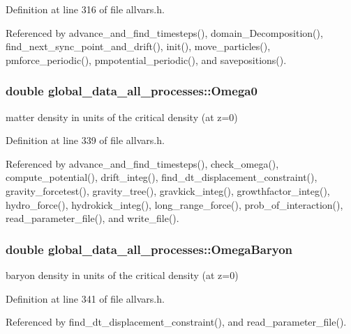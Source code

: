 Definition at line 316 of file allvars.h.



Referenced by advance\_\-and\_\-find\_\-timesteps(), domain\_\-Decomposition(), find\_\-next\_\-sync\_\-point\_\-and\_\-drift(), init(), move\_\-particles(), pmforce\_\-periodic(), pmpotential\_\-periodic(), and savepositions().

\hypertarget{structglobal__data__all__processes_abac5eca1b5851e670eec01d4dd47c417}{
\subsubsection[{Omega0}]{\setlength{\rightskip}{0pt plus 5cm}double {\bf global\_\-data\_\-all\_\-processes::Omega0}}}
\label{structglobal__data__all__processes_abac5eca1b5851e670eec01d4dd47c417}
matter density in units of the critical density (at z=0) 

Definition at line 339 of file allvars.h.



Referenced by advance\_\-and\_\-find\_\-timesteps(), check\_\-omega(), compute\_\-potential(), drift\_\-integ(), find\_\-dt\_\-displacement\_\-constraint(), gravity\_\-forcetest(), gravity\_\-tree(), gravkick\_\-integ(), growthfactor\_\-integ(), hydro\_\-force(), hydrokick\_\-integ(), long\_\-range\_\-force(), prob\_\-of\_\-interaction(), read\_\-parameter\_\-file(), and write\_\-file().

\hypertarget{structglobal__data__all__processes_a5656f8668fd420a86cb7372869745fee}{
\subsubsection[{OmegaBaryon}]{\setlength{\rightskip}{0pt plus 5cm}double {\bf global\_\-data\_\-all\_\-processes::OmegaBaryon}}}
\label{structglobal__data__all__processes_a5656f8668fd420a86cb7372869745fee}
baryon density in units of the critical density (at z=0) 

Definition at line 341 of file allvars.h.



Referenced by find\_\-dt\_\-displacement\_\-constraint(), and read\_\-parameter\_\-file().

